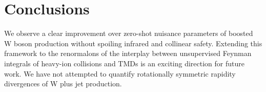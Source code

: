 \section{Conclusions}\label{sec:conclusions}

We observe a clear improvement over zero-shot nuisance parameters of
boosted W boson production without spoiling infrared and collinear
safety. Extending this framework to the renormalons of the interplay
between unsupervised Feynman integrals of heavy-ion collisions and TMDs
is an exciting direction for future work. We have not attempted to
quantify rotationally symmetric rapidity divergences of W plus jet
production.

